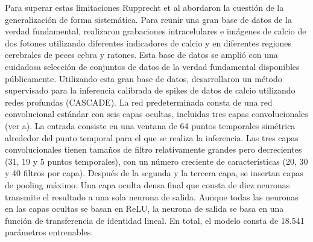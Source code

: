 Para superar estas limitaciones Rupprecht et al \cite{rupprecht_database_2021}  abordaron la cuestión de la generalización de forma sistemática. Para reunir una gran base de datos de la verdad fundamental, realizaron grabaciones intracelulares e imágenes de calcio de dos fotones utilizando diferentes indicadores de calcio y en diferentes regiones cerebrales de peces cebra y ratones. Esta base de datos se amplió con una cuidadosa selección de conjuntos de datos de la verdad fundamental disponibles públicamente. Utilizando esta gran base de datos, desarrollaron un método supervisado para la inferencia calibrada de spikes de datos de calcio utilizando redes profundas (\gls{CASCADE}). La red predeterminada consta de una red convolucional estándar con seis capas ocultas, incluidas tres capas convolucionales  (ver a). La entrada consiste en una ventana de 64 puntos temporales simétrica alrededor del punto temporal para el que se realiza la inferencia. Las tres capas convolucionales tienen tamaños de filtro relativamente grandes pero decrecientes (31, 19 y 5 puntos temporales), con un número creciente de características (20, 30 y 40 filtros por capa). Después de la segunda y la tercera capa, se insertan capas de pooling máximo. Una capa oculta densa final que consta de diez neuronas transmite el resultado a una sola neurona de salida. Aunque todas las neuronas en las capas ocultas se basan en ReLU, la neurona de salida se basa en una función de transferencia de identidad lineal. En total, el modelo consta de 18.541 parámetros entrenables.  




